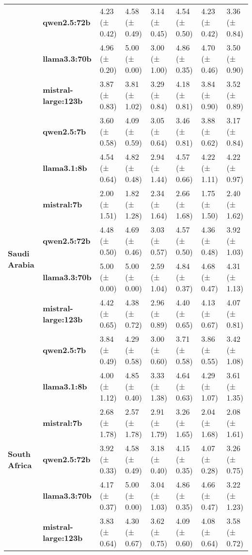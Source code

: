 \begin{longtable}{llllllll}
\textbf{} & \textbf{qwen2.5:72b} & 4.23 (± 0.42) & 4.58 (± 0.49) & 3.14 (± 0.45) & 4.54 (± 0.50) & 4.23 (± 0.42) & 3.36 (± 0.84) \\
\textbf{} & \textbf{llama3.3:70b} & 4.96 (± 0.20) & 5.00 (± 0.00) & 3.00 (± 1.00) & 4.86 (± 0.35) & 4.70 (± 0.46) & 3.50 (± 0.90) \\
\textbf{} & \textbf{mistral-large:123b} & 3.87 (± 0.83) & 3.81 (± 1.02) & 3.29 (± 0.84) & 4.18 (± 0.81) & 3.84 (± 0.90) & 3.52 (± 0.89) \\
\textbf{} & \textbf{qwen2.5:7b} & 3.60 (± 0.58) & 4.09 (± 0.59) & 3.05 (± 0.64) & 3.46 (± 0.81) & 3.88 (± 0.62) & 3.17 (± 0.84) \\
\cline{1-8}
\multirow[t]{6}{*}{\textbf{Saudi Arabia}} & \textbf{llama3.1:8b} & 4.54 (± 0.64) & 4.82 (± 0.48) & 2.94 (± 1.44) & 4.57 (± 0.66) & 4.22 (± 1.11) & 4.22 (± 0.97) \\
\textbf{} & \textbf{mistral:7b} & 2.00 (± 1.51) & 1.82 (± 1.28) & 2.34 (± 1.64) & 2.66 (± 1.68) & 1.75 (± 1.50) & 2.40 (± 1.62) \\
\textbf{} & \textbf{qwen2.5:72b} & 4.48 (± 0.50) & 4.69 (± 0.46) & 3.03 (± 0.57) & 4.57 (± 0.50) & 4.36 (± 0.48) & 3.92 (± 1.03) \\
\textbf{} & \textbf{llama3.3:70b} & 5.00 (± 0.00) & 5.00 (± 0.00) & 2.59 (± 1.04) & 4.84 (± 0.37) & 4.68 (± 0.47) & 4.31 (± 1.13) \\
\textbf{} & \textbf{mistral-large:123b} & 4.42 (± 0.65) & 4.38 (± 0.72) & 2.96 (± 0.89) & 4.40 (± 0.65) & 4.13 (± 0.67) & 4.07 (± 0.81) \\
\textbf{} & \textbf{qwen2.5:7b} & 3.84 (± 0.49) & 4.29 (± 0.58) & 3.00 (± 0.60) & 3.71 (± 0.58) & 3.86 (± 0.55) & 3.42 (± 1.08) \\
\cline{1-8}
\multirow[t]{6}{*}{\textbf{South Africa}} & \textbf{llama3.1:8b} & 4.00 (± 1.12) & 4.85 (± 0.40) & 3.33 (± 1.38) & 4.64 (± 0.63) & 4.29 (± 1.07) & 3.61 (± 1.35) \\
\textbf{} & \textbf{mistral:7b} & 2.68 (± 1.78) & 2.57 (± 1.78) & 2.91 (± 1.79) & 3.26 (± 1.65) & 2.04 (± 1.68) & 2.08 (± 1.61) \\
\textbf{} & \textbf{qwen2.5:72b} & 3.92 (± 0.33) & 4.58 (± 0.49) & 3.18 (± 0.40) & 4.15 (± 0.35) & 4.07 (± 0.28) & 3.26 (± 0.75) \\
\textbf{} & \textbf{llama3.3:70b} & 4.17 (± 0.37) & 5.00 (± 0.00) & 3.04 (± 1.03) & 4.86 (± 0.35) & 4.66 (± 0.47) & 3.22 (± 1.23) \\
\textbf{} & \textbf{mistral-large:123b} & 3.83 (± 0.64) & 4.30 (± 0.67) & 3.62 (± 0.75) & 4.09 (± 0.60) & 4.08 (± 0.64) & 3.58 (± 0.72) \\

\end{longtable}

